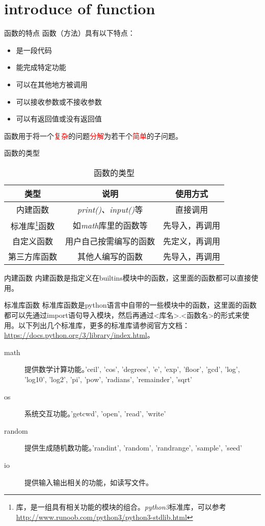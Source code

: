 \documentclass{beamer}
\begin{document}
\section{introduce of function}
\begin{frame}{函数的特点}
函数（方法）具有以下特点：
\begin{itemize}
\item 是一段代码
\item 能完成特定功能
\item 可以在其他地方被调用
\item 可以接收参数或不接收参数
\item 可以有返回值或没有返回值
\end{itemize}
函数用于将一个\textcolor{red}{复杂}的问题\textcolor{red}{分解}为若干个\textcolor{red}{简单}的子问题。
\end{frame}
\begin{frame}{函数的类型}
\begin{table}
\caption{函数的类型}
\begin{center}
\begin{tabular}{ccc}
\toprule
类型&说明&使用方式\\
\midrule
内建函数 &  \textit{print()、input()}等&直接调用\\
标准库\footnote{库，是一组具有相关功能的模块的组合。\textit{python3}标准库，可以参考\url{http://www.runoob.com/python3/python3-stdlib.html}}函数&如\textit{math}库里的函数等&先导入，再调用\\
自定义函数&用户自己按需编写的函数&先定义，再调用\\
第三方库函数&其他人编写的函数&先导入，再调用\\
\bottomrule
\end{tabular}
\end{center}

\end{table}
\end{frame}
\begin{frame}{内建函数}
内建函数是指定义在builtins模块中的函数，这里面的函数都可以直接使用。
\end{frame}
\begin{frame}{标准库函数}
标准库函数是python语言中自带的一些模块中的函数，这里面的函数都可以先通过import语句导入模块，然后再通过<库名>.<函数名>的形式来使用。以下列出几个标准库，更多的标准库请参阅官方文档：\url{https://docs.python.org/3/library/index.html}。
\begin{description}
\item[ math ] 提供数学计算功能。'ceil', 'cos', 'degrees', 'e', 'exp', 'floor', 'gcd', 'log', 'log10', 'log2', 'pi', 'pow', 'radians', 'remainder', 'sqrt'
\item[ os ] 系统交互功能。'getcwd', 'open', 'read', 'write'
\item[ random ] 提供生成随机数功能。'randint', 'random', 'randrange', 'sample', 'seed'
\item[ io ] 提供输入输出相关的功能，如读写文件。
\end{description}

\end{frame}
\end{document}
